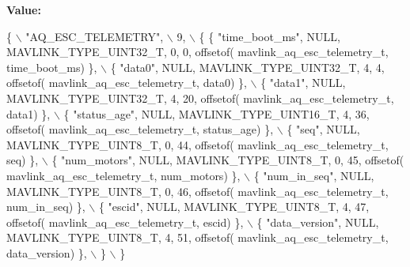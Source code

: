 {\bfseries Value\+:}
\begin{DoxyCode}
\{ \(\backslash\)
    \textcolor{stringliteral}{"AQ\_ESC\_TELEMETRY"}, \(\backslash\)
    9, \(\backslash\)
    \{  \{ \textcolor{stringliteral}{"time\_boot\_ms"}, NULL, MAVLINK_TYPE_UINT32_T, 0, 0, offsetof(
      mavlink_aq_esc_telemetry_t, time\_boot\_ms) \}, \(\backslash\)
         \{ \textcolor{stringliteral}{"data0"}, NULL, MAVLINK_TYPE_UINT32_T, 4, 4, offsetof(
      mavlink_aq_esc_telemetry_t, data0) \}, \(\backslash\)
         \{ \textcolor{stringliteral}{"data1"}, NULL, MAVLINK_TYPE_UINT32_T, 4, 20, offsetof(
      mavlink_aq_esc_telemetry_t, data1) \}, \(\backslash\)
         \{ \textcolor{stringliteral}{"status\_age"}, NULL, MAVLINK_TYPE_UINT16_T, 4, 36, offsetof(
      mavlink_aq_esc_telemetry_t, status\_age) \}, \(\backslash\)
         \{ \textcolor{stringliteral}{"seq"}, NULL, MAVLINK_TYPE_UINT8_T, 0, 44, offsetof(
      mavlink_aq_esc_telemetry_t, seq) \}, \(\backslash\)
         \{ \textcolor{stringliteral}{"num\_motors"}, NULL, MAVLINK_TYPE_UINT8_T, 0, 45, offsetof(
      mavlink_aq_esc_telemetry_t, num\_motors) \}, \(\backslash\)
         \{ \textcolor{stringliteral}{"num\_in\_seq"}, NULL, MAVLINK_TYPE_UINT8_T, 0, 46, offsetof(
      mavlink_aq_esc_telemetry_t, num\_in\_seq) \}, \(\backslash\)
         \{ \textcolor{stringliteral}{"escid"}, NULL, MAVLINK_TYPE_UINT8_T, 4, 47, offsetof(
      mavlink_aq_esc_telemetry_t, escid) \}, \(\backslash\)
         \{ \textcolor{stringliteral}{"data\_version"}, NULL, MAVLINK_TYPE_UINT8_T, 4, 51, offsetof(
      mavlink_aq_esc_telemetry_t, data\_version) \}, \(\backslash\)
         \} \(\backslash\)
\}
\end{DoxyCode}
\mbox{\label{mavlink__msg__aq__esc__telemetry_8h_a958d252dfb93d85077fa78880bf32646}} 
